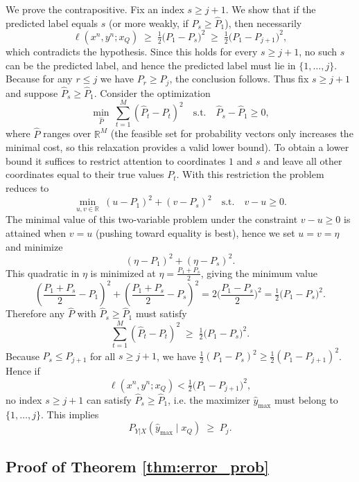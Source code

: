 \documentclass{article} %
\theoremstyle{plain} %
\begin{document}
We prove the contrapositive. Fix an index \(s\ge j+1\). We show that if the predicted label equals \(s\) (or more weakly, if \(\hat P_s \ge \hat P_1\)), then necessarily
\[
\ell(x^n,y^n;x_Q)\;\ge\; \tfrac12\big(P_1-P_s\big)^2
\;\ge\; \tfrac12\big(P_1-P_{j+1}\big)^2,
\]
which contradicts the hypothesis. Since this holds for every \(s\ge j+1\), no such \(s\) can be the predicted label, and hence the predicted label must lie in \(\{1,\dots,j\}\). Because for any \(r\le j\) we have \(P_r\ge P_j\), the conclusion follows.
Thus fix \(s\ge j+1\) and suppose \(\hat P_s \ge \hat P_1\). Consider the optimization
\[
\min_{\hat P}\ \sum_{t=1}^M(\hat P_t-P_t)^2
\quad\text{s.t.}\quad \hat P_s - \hat P_1 \ge 0,
\]
where \(\hat P\) ranges over \(\mathbb{R}^M\) (the feasible set for probability vectors only increases the minimal cost, so this relaxation provides a valid lower bound). To obtain a lower bound it suffices to restrict attention to coordinates \(1\) and \(s\) and leave all other coordinates equal to their true values \(P_t\). With this restriction the problem reduces to
\[
\min_{u,v\in\mathbb{R}}\ (u-P_1)^2 + (v-P_s)^2
\quad\text{s.t.}\quad v-u \ge 0.
\]
The minimal value of this two-variable problem under the constraint \(v-u\ge0\) is attained when \(v=u\) (pushing toward equality is best), hence we set \(u=v=\eta\) and minimize
\[
(\eta-P_1)^2 + (\eta-P_s)^2.
\]
This quadratic in \(\eta\) is minimized at \(\eta = \tfrac{P_1+P_s}{2}\), giving the minimum value
\begin{equation*}
    \left(\frac{P_1+P_s}{2}-P_1\right)^2 + \left(\frac{P_1+P_s}{2}-P_s\right)^2
= 2\Big(\frac{P_1-P_s}{2}\Big)^2
= \tfrac12\big(P_1-P_s\big)^2.
\end{equation*}
Therefore any \(\hat P\) with \(\hat P_s\ge\hat P_1\) must satisfy
\[
\sum_{t=1}^M(\hat P_t-P_t)^2 \;\ge\; \tfrac12\big(P_1-P_s\big)^2.
\]
Because \(P_s\le P_{j+1}\) for all \(s\ge j+1\), we have \(\tfrac12(P_1-P_s)^2\ge \tfrac12(P_1-P_{j+1})^2\). Hence if
\[
\ell(x^n,y^n;x_Q) < \tfrac12\big(P_1-P_{j+1}\big)^2,
\]
no index \(s\ge j+1\) can satisfy \(\hat P_s\ge\hat P_1\), i.e. the maximizer \(\hat y_{\max}\) must belong to \(\{1,\dots,j\}\).
This implies
\[
P_{Y|X}(\hat y_{\max}\mid x_Q)\;\ge\; P_j.
\]

\subsection{Proof of Theorem \ref{thm:error_prob}}\label{append:theorem4_proof}
\end{document}
